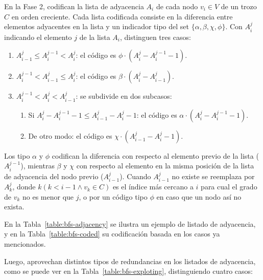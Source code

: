 En la Fase 2, codifican la lista de adyacencia $A_{i}$ de cada nodo $v_{i} \in V$ de un trozo $C$ en orden creciente. Cada lista codificada consiste en la diferencia entre elementos adyacentes en la lista y un indicador tipo del set $\{\alpha, \beta, \chi, \phi\}$. Con $A_{i}^{j}$ indicando el elemento $j$ de la lista $A_{i}$, distinguen tres casos:

\begin{enumerate}
	\item $A_{i - 1}^{j} \leq A_{i}^{j - 1} < A_{i}^{j}$: el código es $\phi \cdot (A_{i}^{j} - A_{i}^{j - 1} - 1)$.
	\item $A_{i}^{j - 1} < A_{i - 1}^{j} \leq A_{i}^{j}$: el código es $\beta \cdot (A_{i}^{j} - A_{i - 1}^{j})$.
	\item $A_{i}^{j - 1} < A_{i}^{j} < A_{i - 1}^{j}$: se subdivide en dos subcasos:
	\begin{enumerate}
		\item Si $A_{i}^{j} - A_{i}^{j - 1} - 1 \leq A_{i - 1}^{j} - A_{i}^{j} - 1$: el código es $\alpha \cdot (A_{i}^{j} - A_{i}^{j - 1} - 1)$.
		\item De otro modo: el código es $\chi \cdot (A_{i - 1}^{j} - A_{i}^{j} - 1)$.
	\end{enumerate}
\end{enumerate}

Los tipo $\alpha$ y $\phi$ codifican la diferencia con respecto al elemento previo de la lista ($A_{i}^{j - 1}$), mientras $\beta$ y $\chi$ con respecto al elemento en la misma posición de la lista de adyacencia del nodo previo ($A_{i - 1}^{j}$). Cuando $A_{i - 1}^{j}$ no existe se reemplaza por $A_{k}^{j}$, donde $k (k < i - 1 \wedge v_{k} \in C)$ es el índice más cercano a $i$ para cual el grado de $v_{k}$ no es menor que $j$, o por un código tipo $\phi$ en caso que un nodo así no exista.

En la Tabla~\ref{table:bfs-adjacency} se ilustra un ejemplo de listado de adyacencia, y en la Tabla~\ref{table:bfs-coded} su codificación basada en los casos ya mencionados.





Luego, aprovechan distintos tipos de redundancias en los listados de adyacencia, como se puede ver en la Tabla~\ref{table:bfs-exploting}, distinguiendo cuatro casos:

